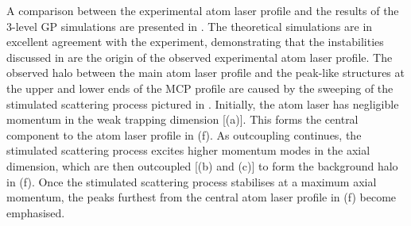 A comparison between the experimental atom laser profile and the results of the 3-level GP simulations are presented in .  The theoretical simulations are in excellent agreement with the experiment, demonstrating that the instabilities discussed in  are the origin of the observed experimental atom laser profile.  The observed halo between the main atom laser profile and the peak-like structures at the upper and lower ends of the MCP profile are caused by the sweeping of the stimulated scattering process pictured in .  Initially, the atom laser has negligible momentum in the weak trapping dimension [(a)].  This forms the central component to the atom laser profile in (f).  As outcoupling continues, the stimulated scattering process excites higher momentum modes in the axial dimension, which are then outcoupled [(b) and (c)] to form the background halo in (f).  Once the stimulated scattering process stabilises at a maximum axial momentum, the peaks furthest from the central atom laser profile in (f) become emphasised.

